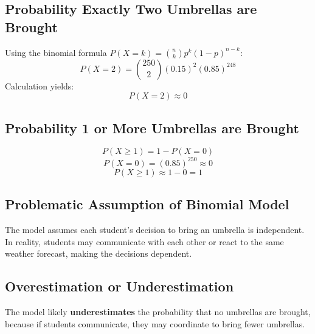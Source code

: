 \documentclass{article}
\begin{document}
\subsection{Probability Exactly Two Umbrellas are Brought}
Using the binomial formula \( P(X = k) = \binom{n}{k} p^k (1-p)^{n-k} \):
\[
P(X = 2) = \binom{250}{2} (0.15)^2 (0.85)^{248}
\]
Calculation yields:
\[
P(X = 2) \approx 0
\]

\subsection{Probability 1 or More Umbrellas are Brought}
\[
P(X \geq 1) = 1 - P(X = 0)
\]
\[
P(X = 0) = (0.85)^{250} \approx 0
\]
\[
P(X \geq 1) \approx 1 - 0 = 1
\]

\subsection{Problematic Assumption of Binomial Model}
The model assumes each student’s decision to bring an umbrella is independent. In reality, students may communicate with each other or react to the same weather forecast, making the decisions dependent.

\subsection{Overestimation or Underestimation}
The model likely \textbf{underestimates} the probability that no umbrellas are brought, because if students communicate, they may coordinate to bring fewer umbrellas.
\end{document}
